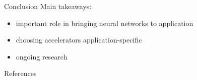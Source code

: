 \documentclass[en]{sdqbeamer}
\begin{document}
	\begin{frame}{Conclusion}
		Main takeaways:
		\begin{itemize}
			\item important role in bringing neural networks to application
			\item choosing accelerators application-specific
			\item ongoing research
		\end{itemize}
	\end{frame}

	\appendix
	\beginbackup
	
	\begin{frame}{References}
		\printbibliography
	\end{frame}
	
\end{document}
